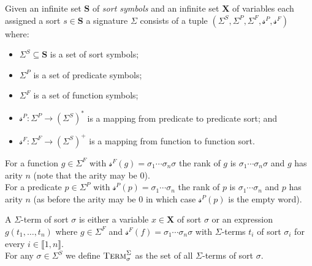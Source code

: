 \begin{definition}[Signature]
Given an infinite set $\mathbf{S}$ of \textit{sort symbols} and an infinite set $\mathbf{X}$ of variables each assigned a sort $s\in\mathbf{S}$ a signature $\Sigma$ consists of a tuple $\left(\Sigma^S, \Sigma^P, \Sigma^F, \mathcal{s}^P, \mathcal{s}^F \right)$ where:
\begin{itemize}
    \item $\Sigma^S \subseteq \mathbf{S}$ is a set of sort symbols;
    \item $\Sigma^P$ is a set of predicate symbols;
    \item $\Sigma^F$ is a set of function symbols;
    \item $\mathcal{s}^P\colon \Sigma^P \to \left(\Sigma^S\right)^\ast$ is a mapping from predicate to predicate sort; and
    \item $\mathcal{s}^F\colon \Sigma^F \to \left(\Sigma^S\right)^+$ is a mapping from function to function sort.
\end{itemize}
\end{definition}

\begin{definition}
For a function $g\in\Sigma^F$ with $\mathcal{s}^F(g)=\sigma_1\dotsi\sigma_n\sigma$ the rank of $g$ is $\sigma_1\dotsi\sigma_n\sigma$ and $g$ has arity $n$ (note that the arity may be $0$).\\
For a predicate $p\in\Sigma^P$ with $\mathcal{s}^P(p)=\sigma_1\dotsi\sigma_n$ the rank of $p$ is $\sigma_1\dotsi\sigma_n$ and $p$ has arity $n$ (as before the arity may be $0$ in which case $\mathcal{s}^P(p)$ is the empty word).
\end{definition}

\begin{definition}
A $\Sigma$-term of sort $\sigma$ is either a variable $x\in\mathbf{X}$ of sort $\sigma$ or an expression $g\left(t_1,\dots,t_n\right)$ where $g\in\Sigma^F$ and $\mathcal{s}^F(f)=\sigma_1\dotsi\sigma_n\sigma$ with $\Sigma$-terms $t_i$ of sort $\sigma_i$ for every $i\in\llbracket1,n\rrbracket$.\\
For any $\sigma\in\Sigma^S$ we define $\textsc{Term}^\Sigma_\sigma$ as the set of all $\Sigma$-terms of sort $\sigma$.
\end{definition}

